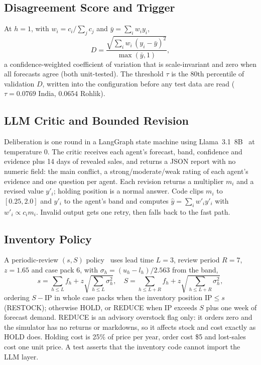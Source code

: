 \documentclass[conference]{IEEEtran}
\begin{document}
\subsection{Disagreement Score and Trigger}
At $h=1$, with $w_i=c_i/\sum_j c_j$ and $\bar y=\sum_i w_i y_i$,
\begin{equation}
D=\frac{\sqrt{\sum_i w_i\,(y_i-\bar y)^2}}{\max(\bar y,1)},
\end{equation}
a confidence-weighted coefficient of variation that is scale-invariant and zero when all forecasts
agree (both unit-tested). The threshold $\tau$ is the 80th percentile of validation $D$, written into
the configuration before any test data are read ($\tau=0.0769$ India, $0.0654$ Rohlik).

\subsection{LLM Critic and Bounded Revision}
Deliberation is one round in a LangGraph state machine using Llama~3.1~8B~\cite{llama3} at
temperature 0. The critic receives each agent's forecast, band, confidence and evidence plus 14 days
of revealed sales, and returns a JSON report with no numeric field: the main conflict, a
strong/moderate/weak rating of each agent's evidence and one question per agent. Each revision
returns a multiplier $m_i$ and a revised value $y'_i$; holding position is a normal answer. Code
clips $m_i$ to $[0.25,2.0]$ and $y'_i$ to the agent's band and computes
$\hat y=\sum_i w'_i y'_i$ with $w'_i\propto c_i m_i$. Invalid output gets one retry, then falls back
to the fast path.

\subsection{Inventory Policy}
A periodic-review $(s,S)$ policy~\cite{silver2017} uses lead time $L=3$, review period $R=7$,
$z=1.65$ and case pack 6, with $\sigma_h=(u_h-l_h)/2.563$ from the band,
\begin{equation}
s=\sum_{h\le L} f_h + z\sqrt{\textstyle\sum_{h\le L}\sigma_h^2},\quad
S=\sum_{h\le L+R} f_h + z\sqrt{\textstyle\sum_{h\le L+R}\sigma_h^2},
\end{equation}
ordering $S-\mathrm{IP}$ in whole case packs when the inventory position $\mathrm{IP}\le s$
(RESTOCK); otherwise HOLD, or REDUCE when $\mathrm{IP}$ exceeds $S$ plus one week of forecast demand.
REDUCE is an advisory overstock flag only: it orders zero and the simulator has no returns or
markdowns, so it affects stock and cost exactly as HOLD does. Holding
cost is 25\% of price per year, order cost \$5 and lost-sales cost one unit price. A test asserts
that the inventory code cannot import the LLM layer.
\end{document}

